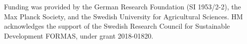 \documentclass[bg, manuscript]{copernicus}
\begin{document}

\begin{acknowledgements}
Funding was provided by the German Research Foundation (SI 1953/2-2), the Max Planck Society, and the Swedish University for Agricultural Sciences. HM acknowledges the support of the Swedish Research Council for Sustainable Development FORMAS, under grant 2018-01820.
\end{acknowledgements}






%
%
%

 
 









\end{document}
